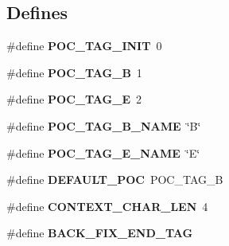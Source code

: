 \subsection*{Defines}
\begin{DoxyCompactItemize}
\item 
\#define {\bfseries POC\_\-TAG\_\-INIT}~0\label{CMAPOCTagger_8cc_adaae9f7e842ab812942e2c8884c5e9fa}

\item 
\#define {\bfseries POC\_\-TAG\_\-B}~1\label{CMAPOCTagger_8cc_a357022548e14d085e3c93f3906bcccd9}

\item 
\#define {\bfseries POC\_\-TAG\_\-E}~2\label{CMAPOCTagger_8cc_a9bdb1f3b570b2741da85e468e4d9f6c9}

\item 
\#define {\bfseries POC\_\-TAG\_\-B\_\-NAME}~\char`\"{}B\char`\"{}\label{CMAPOCTagger_8cc_ad335e18aeb001bbc74ae9991723398d9}

\item 
\#define {\bfseries POC\_\-TAG\_\-E\_\-NAME}~\char`\"{}E\char`\"{}\label{CMAPOCTagger_8cc_aa88cc556dbff3f12beefe55268610c91}

\item 
\#define {\bfseries DEFAULT\_\-POC}~POC\_\-TAG\_\-B\label{CMAPOCTagger_8cc_a491f74f500e8d8fba02698dc4035719c}

\item 
\#define {\bfseries CONTEXT\_\-CHAR\_\-LEN}~4\label{CMAPOCTagger_8cc_a0049a1c5aec42be9da7a350ef77884b8}

\item 
\#define {\bfseries BACK\_\-FIX\_\-END\_\-TAG}
\end{DoxyCompactItemize}
